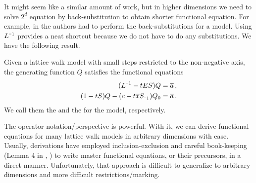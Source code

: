 It might seem like a similar amount of work, but in higher dimensions we need to solve $2^d$ equation by back-substitution to obtain shorter functional equation. For example, in \cite{tabbara2014exact, wong2014confining} the authors had to perform the back-substitutions for a \twoD model. Using $L^{\um 1}$ provides a neat shortcut because we do not have to do any substitutions. We have the following result.

\begin{prop} Given a \oneD lattice walk model with small steps restricted to the non-negative axis, the generating function $Q$ satisfies the functional equations
\begin{subequations}
	\begin{align}
		(L^{\um 1}-t ES)Q &= \ol a\,,\\
		(1-t S)Q-(c-t\ol xS_{\um 1})Q_0 &= \ol a\,.
	\end{align}
\end{subequations}
We call them the  and the  for the model, respectively.
\end{prop}

The operator notation/perspective is powerful. With it, we can derive functional equations for many lattice walk models in arbitrary dimensions with ease. Usually, derivations have employed inclusion-exclusion and careful book-keeping (Lemma 4 in \cite[p.~10]{bousquet2010walks}, \cite[p.~58]{melczer2014variants}) to write master functional equations, or their precursors, in a direct manner. Unfortunately, that approach is difficult to generalize to arbitrary dimensions and more difficult restrictions/marking.

